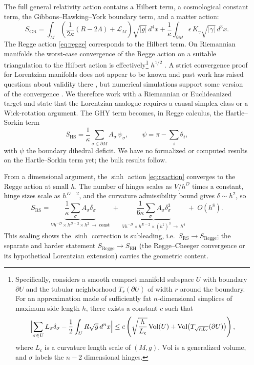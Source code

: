 \documentclass[11pt,letterpaper]{article}
\begin{document}
The full general relativity action contains a Hilbert term, a cosmological constant term, the Gibbons--Hawking--York boundary term, and a matter action:
\begin{equation}
S_{\mathrm{GR}}=\int_{M}\left(\frac{1}{2\kappa}(R-2\Lambda)+\mathcal{L}_{M}\right)\sqrt{|g|}\,d^{4}x+\frac{1}{\kappa}\int_{\partial M}\epsilon\,K_{\gamma}\sqrt{|\gamma|}\,d^{3}x.
\label{eq:sgr}
\end{equation}
The Regge action \eqref{eq:regge} corresponds to the Hilbert term. On Riemannian manifolds the worst-case convergence of the Regge action on a suitable triangulation to the Hilbert action is effectively\footnote{Specifically, \cite{CMS} considers a smooth compact manifold subspace $U$ with boundary $\partial U$ and the tubular neighborhood $T_{r}(\partial U)$ of width $r$ around the boundary. For an approximation made of sufficiently fat $n$-dimensional simplices of maximum side length $h$, there exists a constant $c$ such that
\[
\Bigl|\sum_{\sigma\in U}L_{\sigma}\delta_{\sigma}-\frac{1}{2}\int_{U}R\sqrt{g}\,d^{n}x\Bigr|\le c\left(\sqrt{\frac{h}{L_{c}}}\,\mathrm{Vol}(U)+\mathrm{Vol}\bigl(T_{\sqrt{hL_{c}}}(\partial U)\bigr)\right),
\]
where $L_{c}$ is a curvature length scale of $(M,g)$, $\mathrm{Vol}$ is a generalized volume, and $\sigma$ labels the $n-2$ dimensional hinges.} $h^{1/2}$ \cite{CMS}. A strict convergence proof for Lorentzian manifolds does not appear to be known and past work has raised questions about validity there \cite{Brewin2000}, but numerical simulations support some version of the convergence \cite{Miller,BrewinGentle}. We therefore work with a Riemannian or Euclideanized target and state that the Lorentzian analogue requires a causal simplex class or a Wick-rotation argument. The GHY term becomes, in Regge calculus, the Hartle--Sorkin term \cite{HartleSorkin}
\begin{equation}
S_{\mathrm{HS}}=\frac{1}{\kappa}\sum_{\sigma\in\partial M}A_{\sigma}\,\psi_{\sigma},\qquad \psi=\pi-\sum_{i}\theta_{i},
\label{eq:hs}
\end{equation}
with $\psi$ the boundary dihedral deficit. We have no formalized or computed results on the Hartle--Sorkin term yet; the bulk results follow.

From a dimensional argument, the $\sinh$ action \eqref{eq:rsaction} converges to the Regge action at small $h$. The number of hinges scales as $V/h^{D}$ times a constant, hinge sizes scale as $h^{D-2}$, and the curvature admissibility bound gives $\delta\sim h^{2}$, so
\begin{equation}
S_{\mathrm{RS}}=\underbrace{\frac{1}{\kappa}\sum_{\sigma}A_{\sigma}\delta_{\sigma}}_{V h^{-D}\times h^{D-2}\times h^{2}\ \to\ \mathrm{const}}\;+\;\underbrace{\frac{1}{6\kappa}\sum_{\sigma}A_{\sigma}\delta_{\sigma}^{3}}_{V h^{-D}\times h^{D-2}\times(h^{2})^{3}\ \to\ h^{4}}\;+\;O(h^{8}).
\label{eq:scaling}
\end{equation}
This scaling shows the $\sinh$ correction is subleading, i.e.\ $S_{\mathrm{RS}}\to S_{\mathrm{Regge}}$; the separate and harder statement $S_{\mathrm{Regge}}\to S_{\mathrm{EH}}$ (the Regge--Cheeger convergence or its hypothetical Lorentzian extension) carries the geometric content.
\end{document}
